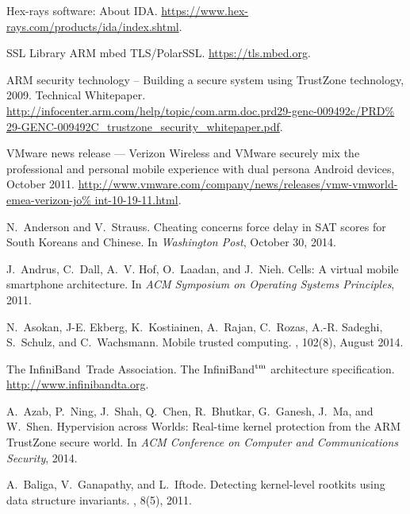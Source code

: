 \documentclass[pageno]{sig-alternate-05-2015}
\begin{document}
\raggedright
\begin{thebibliography}{10}

Hex-rays software: About {IDA}.
\newblock \url{https://www.hex-rays.com/products/ida/index.shtml}.

{SSL Library} {ARM} mbed {TLS}/{PolarSSL}.
\newblock \url{https://tls.mbed.org}.

{ARM} security technology -- {Building} a secure system using {TrustZone}
  technology, 2009.
 Technical Whitepaper.
  \url{http://infocenter.arm.com/help/topic/com.arm.doc.prd29-genc-009492c/PRD%
29-GENC-009492C_trustzone_security_whitepaper.pdf}.

{VMware} news release --- {Verizon Wireless} and {VMware} securely mix the
  professional and personal mobile experience with dual persona {Android}
  devices, October 2011.
\newblock
  \url{http://www.vmware.com/company/news/releases/vmw-vmworld-emea-verizon-jo%
int-10-19-11.html}.

N.~Anderson and V.~Strauss.
\newblock Cheating concerns force delay in {SAT} scores for {South Koreans} and
  {Chinese}.
\newblock In {\em Washington Post}, October 30, 2014.

J.~Andrus, C.~Dall, A.~V. Hof, O.~Laadan, and J.~Nieh.
\newblock Cells: A virtual mobile smartphone architecture.
\newblock In {\em ACM Symposium on Operating Systems Principles}, 2011.

N.~Asokan, J-E. Ekberg, K.~Kostiainen, A.~Rajan, C.~Rozas, A.-R. Sadeghi,
  S.~Schulz, and C.~Wachsmann.
\newblock Mobile trusted computing.
, 102(8), August 2014.

The {InfiniBand}~Trade Association.
\newblock The {InfiniBand}$^{\rm \relax{tm}}$ architecture specification.
\newblock \url{http://www.infinibandta.org}.

A.~Azab, P.~Ning, J.~Shah, Q.~Chen, R.~Bhutkar, G.~Ganesh, J.~Ma, and W.~Shen.
\newblock Hypervision across {Worlds}: {Real-time} kernel protection from the
  {ARM} {TrustZone} secure world.
\newblock In {\em ACM Conference on Computer and Communications Security},
  2014.

A.~Baliga, V.~Ganapathy, and L.~Iftode.
\newblock Detecting kernel-level rootkits using data structure invariants.
, 8(5),
  2011.


\end{thebibliography}
\end{document}
